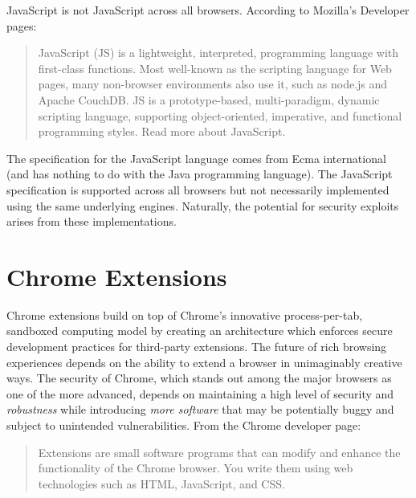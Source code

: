 \documentclass[a4paper, 11pt]{article} %
\begin{document}
JavaScript is not JavaScript across all browsers. According to Mozilla's Developer pages:

\begin{quotation}
JavaScript (JS) is a lightweight, interpreted, programming language with first-class functions. Most well-known as the scripting language for Web pages, many non-browser environments also use it, such as node.js and Apache CouchDB. JS is a prototype-based, multi-paradigm, dynamic scripting language, supporting object-oriented, imperative, and functional programming styles. Read more about JavaScript. \cite{JavaS76:online}
\end{quotation}

The specification for the JavaScript language comes from Ecma international (and has nothing to do with the Java programming language). The JavaScript specification is supported across all browsers but not necessarily implemented using the same underlying engines. Naturally, the potential for security exploits arises from these implementations.


\section{Chrome Extensions}

Chrome extensions build on top of Chrome's innovative process-per-tab, sandboxed computing model by creating an architecture which enforces secure development practices for third-party extensions. The future of rich browsing experiences depends on the ability to extend a browser in unimaginably creative ways. The security of Chrome, which stands out among the major browsers as one of the more advanced, depends on maintaining a high level of security and \textit{robustness} while introducing \textit{more software} that may be potentially buggy and subject to unintended vulnerabilities. From the  Chrome developer page:

\begin{quotation}
	Extensions are small software programs that can modify and enhance the functionality of the Chrome browser. You write them using web technologies such as HTML, JavaScript, and CSS. \cite{Whata95:online}
\end{quotation}
\end{document}
